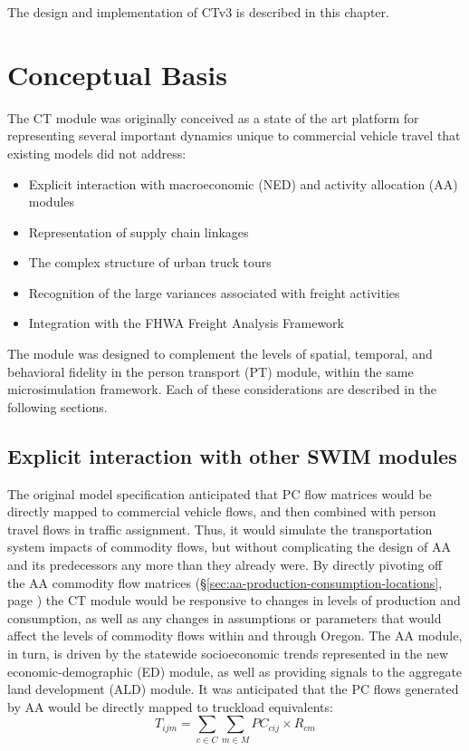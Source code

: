 The design and implementation of CTv3 is described in this chapter.

\section{Conceptual Basis}
The CT module was originally conceived as a state of the art platform for representing several important dynamics unique to commercial vehicle travel that existing models did not address:
\begin{itemize}
\item Explicit interaction with macroeconomic (NED) and activity allocation (AA) modules
\item Representation of supply chain linkages
\item The complex structure of urban truck tours
\item Recognition of the large variances associated with freight activities
\item Integration with the FHWA Freight Analysis Framework
\end{itemize}

The module was designed to complement the levels of spatial, temporal, and behavioral fidelity in the person transport (PT) module, within the same microsimulation framework. Each of these considerations are described in the following sections.

\subsection{Explicit interaction with other SWIM modules}\label{sec:ct-swim-integration}
The original model specification anticipated that PC flow matrices would be directly mapped to commercial vehicle flows, and then combined with person travel flows in traffic assignment. Thus, it would simulate the transportation system impacts of commodity flows, but without complicating the design of AA and its predecessors any more than they already were. By directly pivoting off the AA commodity flow matrices (\S\ref{sec:aa-production-consumption-locations}, page \pageref{sec:aa-production-consumption-locations}) the CT module would be responsive to changes in levels of production and consumption, as well as any changes in assumptions or parameters that would affect the levels of commodity flows within and through Oregon. The AA module, in turn, is driven by the statewide socioeconomic trends represented in the new economic-demographic (ED) module, as well as providing signals to the aggregate land development (ALD) module. It was anticipated that the PC flows generated by AA would be directly mapped to truckload equivalents:
\begin{equation}
\label{eq:direct-mapping}
T_{ijm} = \sum_{c \in C} \sum_{m \in M} PC_{cij} \times R_{cm}
\end{equation}

